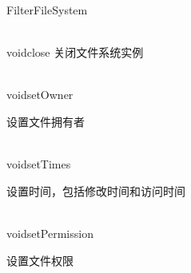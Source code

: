\begin{XeClass}{FilterFileSystem}
\begin{XeMethod}{\XePublic\\ }{void}{close}
 关闭文件系统实例

  \end{XeMethod}

  \begin{XeMethod}{\XePublic\\ }{void}{setOwner}
       
 设置文件拥有者

  \end{XeMethod}

  \begin{XeMethod}{\XePublic\\ }{void}{setTimes}
       
 设置时间，包括修改时间和访问时间

  \end{XeMethod}

  \begin{XeMethod}{\XePublic\\ }{void}{setPermission}
       
 设置文件权限

  \end{XeMethod}

\end{XeClass}
